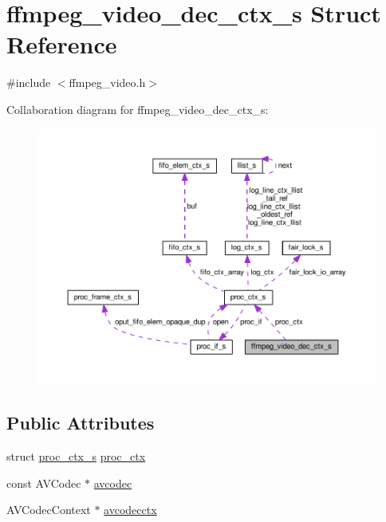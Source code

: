 \hypertarget{structffmpeg__video__dec__ctx__s}{}\section{ffmpeg\+\_\+video\+\_\+dec\+\_\+ctx\+\_\+s Struct Reference}
\label{structffmpeg__video__dec__ctx__s}


{\ttfamily \#include $<$ffmpeg\+\_\+video.\+h$>$}



Collaboration diagram for ffmpeg\+\_\+video\+\_\+dec\+\_\+ctx\+\_\+s\+:\nopagebreak
\begin{figure}[H]
\begin{center}
\leavevmode
\includegraphics[width=350pt]{structffmpeg__video__dec__ctx__s__coll__graph}
\end{center}
\end{figure}
\subsection*{Public Attributes}
\begin{DoxyCompactItemize}
\item 
struct \hyperlink{structproc__ctx__s}{proc\+\_\+ctx\+\_\+s} \hyperlink{structffmpeg__video__dec__ctx__s_a9c234e383747ab90b5efd066e0773f1f}{proc\+\_\+ctx}
\item 
const A\+V\+Codec $\ast$ \hyperlink{structffmpeg__video__dec__ctx__s_a98973b6abbd43effdd95f4970939f7e1}{avcodec}
\item 
A\+V\+Codec\+Context $\ast$ \hyperlink{structffmpeg__video__dec__ctx__s_a440f95e9f5ef2f16fa0d70262eec4ca8}{avcodecctx}
\end{DoxyCompactItemize}


